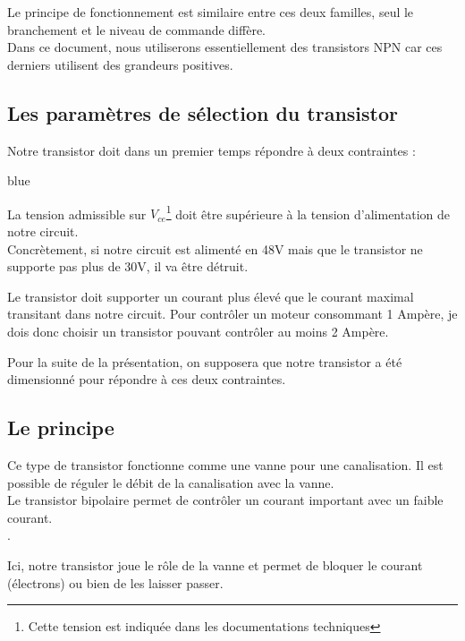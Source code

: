 Le principe de fonctionnement est similaire entre ces deux familles, seul le branchement et le niveau de commande diffère.\\ Dans ce document, nous utiliserons essentiellement des transistors NPN car ces derniers utilisent des grandeurs positives.



\subsection{Les paramètres de sélection du transistor}

Notre transistor doit dans un premier temps répondre à deux contraintes : 

\begin{items}{blue}{\Triangle}

  \item La tension admissible sur $V_{ce}$\footnote{Cette tension est indiquée dans les documentations techniques} doit être supérieure à la tension d'alimentation de notre circuit.\\
  Concrètement, si notre circuit est alimenté en 48V mais que le transistor ne supporte pas plus de 30V, il va être détruit.
  \item Le transistor doit supporter un courant plus élevé que le courant maximal transitant dans notre circuit.
  Pour contrôler un moteur consommant 1 Ampère, je dois donc choisir un transistor pouvant contrôler au moins 2 Ampère.
\end{items}

Pour la suite de la présentation, on supposera que notre transistor a été dimensionné pour répondre à ces deux contraintes.


\subsection{Le principe}

Ce type de transistor fonctionne comme une vanne pour une canalisation. Il est possible de réguler le débit de la canalisation avec la vanne.\\

Le transistor bipolaire permet de contrôler un courant important avec un faible courant.\\

.

Ici, notre transistor joue le rôle de la vanne et permet de bloquer le courant (électrons) ou bien de les laisser passer. \\


